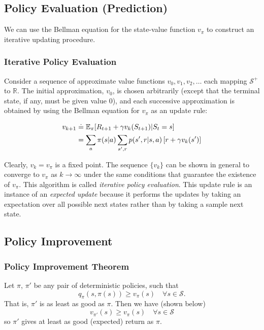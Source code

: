 \subsection{Policy Evaluation (Prediction)}
We can use the Bellman equation for the state-value function $v_\pi$ to construct an iterative updating procedure.

\subsubsection*{Iterative Policy Evaluation}
Consider a sequence of approximate value functions $v_0, v_1, v_2, \dots$ each mapping $\mathcal{S}^{+}$ to $\mathbb{R}$. The initial approximation, $v_0$, is chosen arbitrarily (except that the terminal state, if any, must be given value $0$), and each successive approximation is obtained by using the Bellman equation for $v_\pi$ as an update rule:

\begin{align}
    v_{k+1} &\doteq \mathbb{E}_\pi [R_{t+1} + \gamma v_{k}(S_{t+1}) | S_t = s] \\
            &= \sum_a \pi(s|a) \sum_{s', r} p(s', r| s, a) \left[r + \gamma v_k(s')\right]
\end{align}

Clearly, $v_k = v_\pi$ is a fixed point. The sequence $\{v_k\}$ can be shown in general to converge to $v_\pi$ as $k \to \infty$ under the same conditions that guarantee the existence of $v_\pi$. This algorithm is called \emph{iterative policy evaluation}. This update rule is an instance of an \emph{expected update} because it performs the updates by taking an expectation over all possible next states rather than by taking a sample next state.\\

\subsection{Policy Improvement}
\subsubsection*{Policy Improvement Theorem}

Let $\pi$, $\pi'$ be any pair of deterministic policies, such that
\begin{equation}
    q_\pi(s, \pi(s)) \geq v_\pi(s) \quad \forall s \in \mathcal{S}.
\end{equation}
That is, $\pi'$ is as least as good as $\pi$. Then we have (shown below)
\begin{equation}
    v_{\pi'}(s) \geq v_\pi(s) \quad \forall s \in \mathcal{S}
\end{equation}
so $\pi'$ gives at least as good (expected) return as $\pi$.\\

